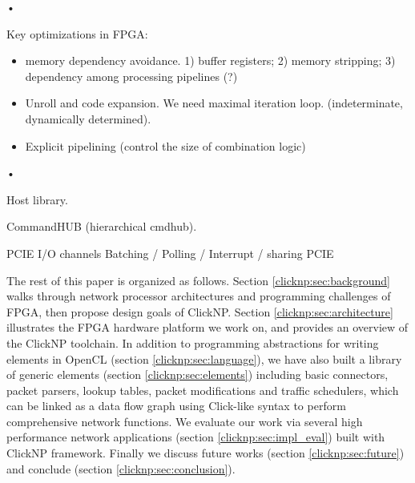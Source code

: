 {\begin{itemize}
\end{itemize}•


Key optimizations in FPGA:
\begin{itemize}
\item memory dependency avoidance. 1) buffer registers; 2) memory stripping; 3) dependency among processing pipelines (?) 
\item Unroll and code expansion. We need maximal iteration loop. (indeterminate, dynamically determined). 
\item Explicit pipelining (control the size of combination logic)
\end{itemize}•


Host library.

CommandHUB (hierarchical cmdhub).

PCIE I/O channels
Batching / Polling / Interrupt / sharing PCIE 

The rest of this paper is organized as follows. Section \ref{clicknp:sec:background} walks through network processor architectures and programming challenges of FPGA, then propose design goals of ClickNP. Section \ref{clicknp:sec:architecture} illustrates the FPGA hardware platform we work on, and provides an overview of the ClickNP toolchain. In addition to programming abstractions for writing elements in OpenCL (section \ref{clicknp:sec:language}), we have also built a library of generic elements (section \ref{clicknp:sec:elements}) including basic connectors, packet parsers, lookup tables, packet modifications and traffic schedulers, which can be linked as a data flow graph using Click-like syntax to perform comprehensive network functions. We evaluate our work via several high performance network applications (section \ref{clicknp:sec:impl_eval}) built with ClickNP framework. Finally we discuss future works (section \ref{clicknp:sec:future}) and conclude (section \ref{clicknp:sec:conclusion}).
}
